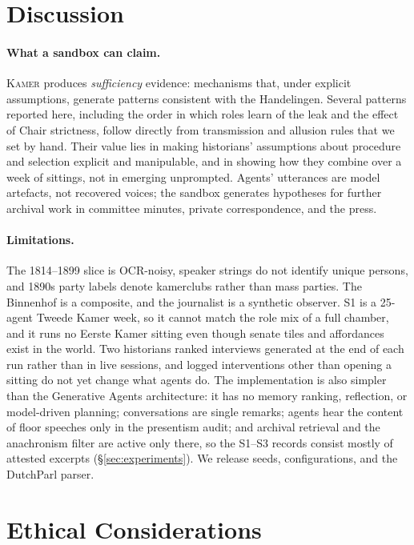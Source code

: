 \documentclass[sigconf,review,anonymous]{acmart}
\newcommand{\sys}{\textsc{Kamer}}
\begin{document}
\section{Discussion}
\label{sec:discussion}

\paragraph{What a sandbox can claim.} \sys{} produces \emph{sufficiency}
evidence: mechanisms that, under explicit assumptions, generate patterns
consistent with the Handelingen. Several patterns reported here, including
the order in which roles learn of the leak and the effect of Chair
strictness, follow directly from transmission and allusion rules that we
set by hand. Their value lies in making historians' assumptions about
procedure and selection explicit and manipulable, and in showing how they
combine over a week of sittings, not in emerging unprompted. Agents'
utterances are model artefacts, not recovered voices; the sandbox
generates hypotheses for further archival work in committee minutes,
private correspondence, and the press.

\paragraph{Limitations.} The 1814--1899 slice is OCR-noisy, speaker
strings do not identify unique persons, and 1890s party labels denote
kamerclubs rather than mass parties. The Binnenhof is a composite, and the
journalist is a synthetic observer. S1 is a 25-agent Tweede Kamer week, so
it cannot match the role mix of a full chamber, and it runs no Eerste Kamer
sitting even though senate tiles and affordances exist in the world. Two
historians ranked interviews generated at the end of each run rather
than in live sessions, and logged interventions other than opening a
sitting do not yet change what agents do. The implementation is also simpler
than the Generative Agents architecture: it has no memory ranking,
reflection, or model-driven planning; conversations are single remarks;
agents hear the content of floor speeches only in the presentism audit;
and archival retrieval and the anachronism filter are active only there,
so the S1--S3 records consist mostly of attested excerpts
(\S\ref{sec:experiments}). We release seeds, configurations, and the
DutchParl parser.

\section{Ethical Considerations}
\label{sec:ethics}
\end{document}
